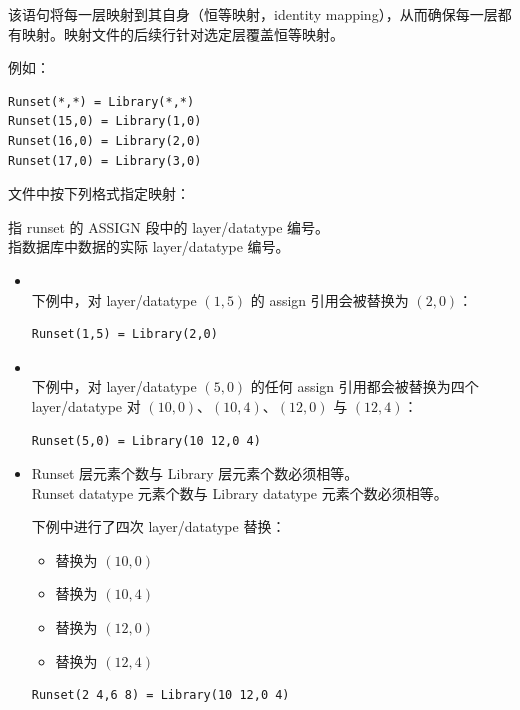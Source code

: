 该语句将每一层映射到其自身（恒等映射，identity mapping），从而确保每一层都有映射。映射文件的后续行针对选定层覆盖恒等映射。

例如：
\begin{lstlisting}
Runset(*,*) = Library(*,*)
Runset(15,0) = Library(1,0)
Runset(16,0) = Library(2,0)
Runset(17,0) = Library(3,0)
\end{lstlisting}

文件中按下列格式指定映射：

\begin{noteBox}
 指 runset 的 ASSIGN 段中的 layer/datatype 编号。\\
 指数据库中数据的实际 layer/datatype 编号。
\end{noteBox}

\begin{itemize}
  \item {}\\
  下例中，对 layer/datatype $(1,5)$ 的 assign 引用会被替换为 $(2,0)$：
\begin{lstlisting}
Runset(1,5) = Library(2,0)
\end{lstlisting}

  \item {}\\
  下例中，对 layer/datatype $(5,0)$ 的任何 assign 引用都会被替换为四个 layer/datatype 对 $(10,0)$、$(10,4)$、$(12,0)$ 与 $(12,4)$：
\begin{lstlisting}
Runset(5,0) = Library(10 12,0 4)
\end{lstlisting}

  \item {}
\begin{noteBox}
Runset 层元素个数与 Library 层元素个数必须相等。\\
Runset datatype 元素个数与 Library datatype 元素个数必须相等。
\end{noteBox}
  下例中进行了四次 layer/datatype 替换：
  \begin{itemize}
    \item {} 替换为 $(10,0)$
    \item {} 替换为 $(10,4)$
    \item {} 替换为 $(12,0)$
    \item {} 替换为 $(12,4)$
  \end{itemize}
\begin{lstlisting}
Runset(2 4,6 8) = Library(10 12,0 4)
\end{lstlisting}
\end{itemize}

